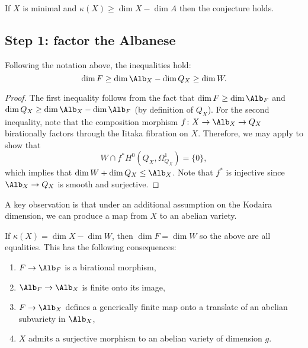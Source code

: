 \documentclass[12pt]{article}
\begin{document}
\begin{theorem}[CCH, '23]
If $X$ is minimal and $\kappa(X) \ge \dim{X} - \dim{A}$ then the conjecture holds. 
\end{theorem}

\subsection{Step 1: factor the Albanese}

\begin{lemma}
Following the notation above, the inequalities hold:
\begin{equation}\label{eq:1}
    \dim{F} \ge \dim{\Alb_X} - \dim{Q_X} \ge \dim{W}.
\end{equation}
\end{lemma}

\begin{proof}
The first inequality follows from the fact that $\dim{F} \ge \dim{\Alb_F}$ \cite[Theorem 1]{kawamata_abelian_varieties} and $\dim{Q_X} \ge \dim{\Alb_X} - \dim{\Alb_F}$ (by definition of $Q_X$). For the second inequality, note that the composition morphism $f \colon X \to \Alb_{X} \to Q_X$ birationally factors through the Iitaka fibration on $X$. Therefore, we may apply \cite[Theorem 2.1]{PS14} to show that
\[ W \cap f^{*} H^{0}(Q_X, \Omega_{Q_X}^1) = \{ 0 \}, \]
which implies that $\dim W + \dim Q_X \leq \Alb_{X}$. Note that $f^{\ast}$ is injective since $\Alb_X \to Q_X$ is smooth and surjective.
\end{proof}

A key observation is that under an additional assumption on the Kodaira dimension, we can produce a map from $X$ to an abelian variety.

\begin{theorem} \label{non_contraction}
If $\kappa(X) = \dim{X} - \dim{W}$, then $\dim{F} = \dim{W}$ so the above are all equalities. This has the following consequences:
\begin{enumerate}
\item $F \to \Alb_F$ is a birational morphism,
\item $\Alb_F \to \Alb_X$ is finite \etale onto its image,
\item $F \to \Alb_X$ defines a generically finite map onto a translate of an abelian subvariety in $\Alb_{X}$,
\item $X$ admits a surjective morphism to an abelian variety of dimension $g$.
\end{enumerate}
\end{theorem}
\end{document}
